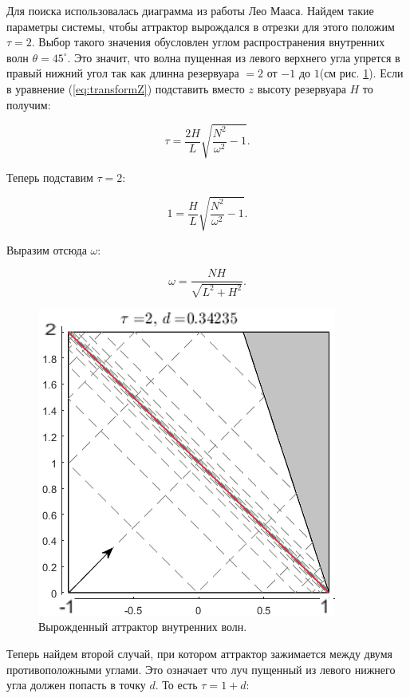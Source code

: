 Для поиска использовалась диаграмма из работы Лео Мааса\cite{Maas1997}. Найдем такие параметры системы, чтобы аттрактор вырождался в отрезки для этого положим $\tau=2$. Выбор такого значения обусловлен углом распространения внутренних волн $\theta = 45^{\circ}$. Это значит, что волна пущенная из левого верхнего угла упрется в правый нижний угол так как длинна резервуара $=2$ от $-1$ до $1$(см рис. \ref{fig:trivAttr}). Если в уравнение (\ref{eq:transformZ}) подставить вместо $z$ высоту резервуара $H$ то получим:

\begin{equation}
    \tau=\frac{2H}{L} \sqrt{\frac{N^2}{\omega^2}-1}.
\end{equation}

Теперь подставим $\tau=2$:

\begin{equation}
    1=\frac{H}{L} \sqrt{\frac{N^2}{\omega^2}-1}.
\end{equation}

Выразим отсюда $\omega$:

\begin{equation}
    \omega=\frac{NH}{\sqrt{L^2+H^2}}.
\end{equation}

\begin{figure}
    \centering
    \includegraphics[scale=0.8]{Figs/CritAttrFreq.png}
    \caption{Вырожденный аттрактор внутренних волн.}
    \label{fig:trivAttr}
\end{figure}

Теперь найдем второй случай, при котором аттрактор зажимается между двумя противоположными углами. Это означает что луч пущенный из левого нижнего угла должен попасть в точку $d$. То есть $\tau = 1+d$:

